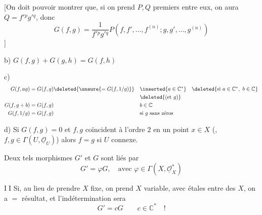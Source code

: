 [On doit pouvoir montrer que, si on prend $P,Q$
premiers entre eux, on aura 
$Q=f'{}^p g'{}^q$, donc
\[
G(f,g)=\frac{1}{f'{}^p g'{}^q}
P(f,f',\ldots,f^{(n)};g,g',\ldots,g^{(n)})
\]
]

b) $G(f,g)+G(g,h)=G(f,h)$

c)
\[
\begin{aligned}
G(f,ag)&=G(f,g)\deleted{\unsure{=G(f,1/g)}}
&&\inserted{a\in\mathbb{C}^{*}}\quad
\deleted{\text{si }a\in\mathbb{C}^{*},\ b\in\mathbb{C}}\\
&&&\deleted{(\text{et }g)}\\
G(f,g+b)&=G(f,g)&&b\in\mathbb{C}\\
G(f,1/g)&=G(f,g)&&\text{si }g\text{ sans zéros}
\end{aligned}
\]

d)  Si $G(f,g)=0$ et $f,g$ coïncident à l'ordre $2$
en un point $x\in X$ (, $f,g\in\Gamma(U,\underline{\mathcal{O}}_U)$)
alors $f=g$ si $U$ connexe.

Deux tels morphismes $G'$ et $G$ sont liés par
\[
G'=\varphi G,\quad\text{avec }\varphi\in\Gamma(X,\underline{\mathcal{O}}_X^{*})
\]




\textcircled{II} Si, au lieu de prendre $X$ fixe, on prend $X$ variable,
avec  étales entre des $X$, on a
$=$ résultat, et l'indétermination sera
\[
G'=cG\qquad c\in\mathbb{C}^{*}\quad !
\]

